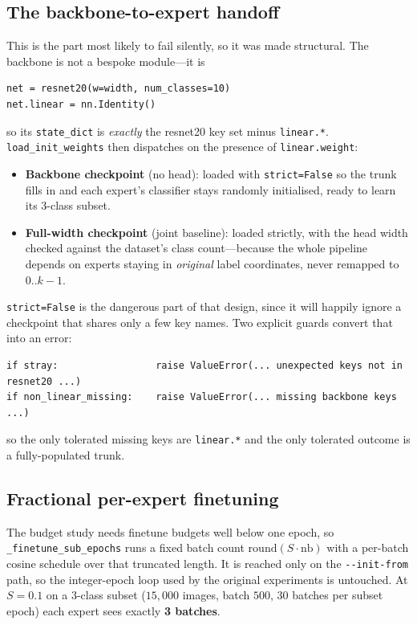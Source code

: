 \documentclass[11pt,a4paper]{article}
\newcommand{\code}[1]{\texttt{\small #1}}
\begin{document}
\subsection{The backbone-to-expert handoff}

This is the part most likely to fail silently, so it was made structural. The
backbone is not a bespoke module---it is

\begin{lstlisting}
net = resnet20(w=width, num_classes=10)
net.linear = nn.Identity()
\end{lstlisting}

so its \code{state\_dict} is \emph{exactly} the resnet20 key set minus
\code{linear.*}. \code{load\_init\_weights} then dispatches on the presence of
\code{linear.weight}:

\begin{itemize}[leftmargin=*]
\item \textbf{Backbone checkpoint} (no head): loaded with \code{strict=False} so
      the trunk fills in and each expert's classifier stays randomly
      initialised, ready to learn its 3-class subset.
\item \textbf{Full-width checkpoint} (joint baseline): loaded strictly, with the
      head width checked against the dataset's class count---because the whole
      pipeline depends on experts staying in \emph{original} label coordinates,
      never remapped to $0..k{-}1$.
\end{itemize}

\code{strict=False} is the dangerous part of that design, since it will happily
ignore a checkpoint that shares only a few key names. Two explicit guards
convert that into an error:

\begin{lstlisting}
if stray:                 raise ValueError(... unexpected keys not in resnet20 ...)
if non_linear_missing:    raise ValueError(... missing backbone keys ...)
\end{lstlisting}

so the only tolerated missing keys are \code{linear.*} and the only tolerated
outcome is a fully-populated trunk.

\subsection{Fractional per-expert finetuning}

The budget study needs finetune budgets well below one epoch, so
\code{\_finetune\_sub\_epochs} runs a fixed batch count
$\mathrm{round}(S \cdot \mathrm{nb})$ with a per-batch cosine schedule over that
truncated length. It is reached only on the \code{-{}-init-from} path, so the
integer-epoch loop used by the original experiments is untouched. At $S{=}0.1$
on a 3-class subset ($15{,}000$ images, batch $500$, $30$ batches per subset
epoch) each expert sees exactly \textbf{3 batches}.
\end{document}
